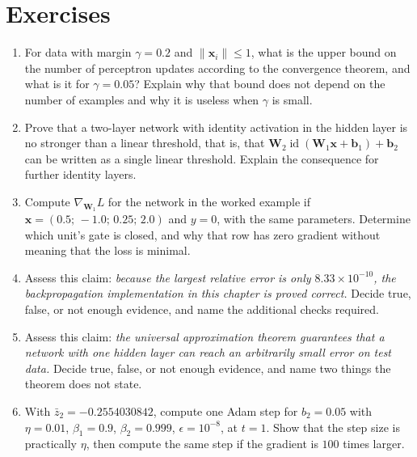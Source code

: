 \section{Exercises}

\begin{latihan}
\begin{enumerate}
  \item For data with margin $\gamma=0.2$ and $\lVert\mathbf{x}_{i}\rVert\le1$, what is the upper
        bound on the number of perceptron updates according to the convergence theorem, and what
        is it for $\gamma=0.05$? Explain why that bound does not depend on the number of examples
        and why it is useless when $\gamma$ is small.

  \item Prove that a two-layer network with identity activation in the hidden layer is no stronger
        than a linear threshold, that is, that
        $\mathbf{W}_{2}\operatorname{id}(\mathbf{W}_{1}\mathbf{x}+\mathbf{b}_{1})+\mathbf{b}_{2}$
        can be written as a single linear threshold. Explain the consequence for further identity
        layers.

  

  \item Compute $\nabla_{\mathbf{W}_{1}}L$ for the network in the worked example if
        $\mathbf{x}=(0.5;\,-1.0;\,0.25;\,2.0)$ and $y=0$, with the same parameters. Determine
        which unit's gate is closed, and why that row has zero gradient without meaning that the
        loss is minimal.

  \item Assess this claim: \emph{because the largest relative error is only
        $8.33\times10^{-10}$, the backpropagation implementation in this chapter is proved
        correct.} Decide true, false, or not enough evidence, and name the additional checks
        required.

  \item Assess this claim: \emph{the universal approximation theorem guarantees that a network
        with one hidden layer can reach an arbitrarily small error on test data.} Decide true,
        false, or not enough evidence, and name two things the theorem does not state.

  \item With $\bar{z}_{2}=-0.2554030842$, compute one Adam step for $b_{2}=0.05$ with
        $\eta=0.01$, $\beta_{1}=0.9$, $\beta_{2}=0.999$, $\epsilon=10^{-8}$, at $t=1$. Show that
        the step size is practically $\eta$, then compute the same step if the gradient is $100$
        times larger.


\end{enumerate}
\end{latihan}
